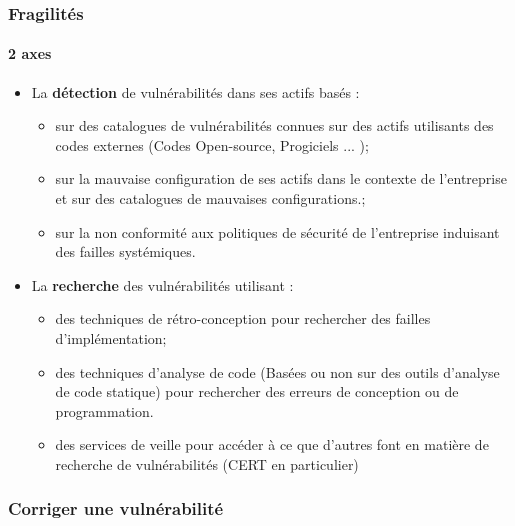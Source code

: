 \begin{frame}
\frametitle<presentation>{Fragilités}
\framesubtitle<presentation>{2 axes}
\begin{itemize}
  \item La \textbf{détection} de vulnérabilités dans ses actifs basés :
	\begin{itemize}
		  \item sur des catalogues de vulnérabilités connues sur des actifs  utilisants des codes externes (Codes Open-source, Progiciels ... ); 
 		 \item  sur la mauvaise configuration de ses actifs dans le contexte de l'entreprise et sur des catalogues de mauvaises configurations.;
		  \item  sur la non conformité aux politiques de sécurité de l'entreprise induisant des failles systémiques.
		\end{itemize}
 \item La \textbf{recherche} des vulnérabilités utilisant :
\begin{itemize}
		\item	des techniques de rétro-conception pour rechercher des failles d'implémentation;
		\item	des techniques d'analyse de code (Basées ou non sur des outils d'analyse de code statique) pour rechercher des erreurs de conception ou de programmation.
		\item	des services de veille  pour accéder à ce que d'autres font en matière de recherche de vulnérabilités (CERT en particulier)
\end{itemize}
\end{itemize}
\end{frame}





\begin{frame}
\frametitle<presentation>{Corriger une vulnérabilité}
\end{frame}



